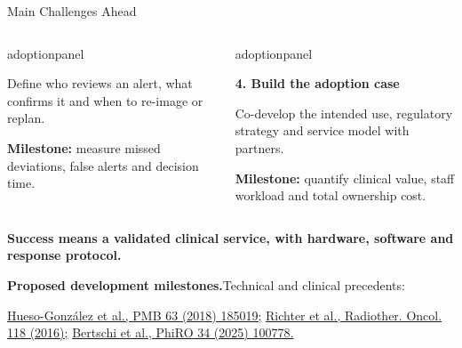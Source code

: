 \documentclass[aspectratio=169,11pt]{beamer}
\begin{document}
\begin{frame}{Main Challenges Ahead}
\begin{columns}[T,onlytextwidth]
\begin{beamercolorbox}[sep=6pt,wd=\linewidth]{adoptionpanel}
\begin{minipage}[t][1.65cm][t]{\linewidth}
\vspace{0.07cm}
{\scriptsize Define who reviews an alert, what confirms it and when to re-image or replan.\par\vspace{0.08cm}\textbf{Milestone:} measure missed deviations, false alerts and decision time.\par}
\end{minipage}
\end{beamercolorbox}
\begin{beamercolorbox}[sep=6pt,wd=\linewidth]{adoptionpanel}
\begin{minipage}[t][1.65cm][t]{\linewidth}\raggedright
{\footnotesize\bfseries\color{crBlue}4. Build the adoption case\par}
\vspace{0.07cm}
{\scriptsize Co-develop the intended use, regulatory strategy and service model with partners.\par\vspace{0.08cm}\textbf{Milestone:} quantify clinical value, staff workload and total ownership cost.\par}
\end{minipage}
\end{beamercolorbox}
\end{columns}

\vspace{0.16cm}
{\footnotesize\bfseries\color{darkred}
Success means a validated clinical service, with hardware, software and response protocol.\par}
\vfill
{\fontsize{6}{7}\selectfont\color{crGrey}\raggedright
\textbf{Proposed development milestones.}\quad Technical and clinical precedents:\par
\href{https://doi.org/10.1088/1361-6560/aad513}
{Hueso-Gonz\'alez et al., PMB 63 (2018) 185019;}\quad
\href{https://doi.org/10.1016/j.radonc.2016.01.004}
{Richter et al., Radiother. Oncol. 118 (2016);}\quad
\href{https://doi.org/10.1016/j.phro.2025.100778}
{Bertschi et al., PhiRO 34 (2025) 100778.}\par
}
\end{frame}


\end{document}
